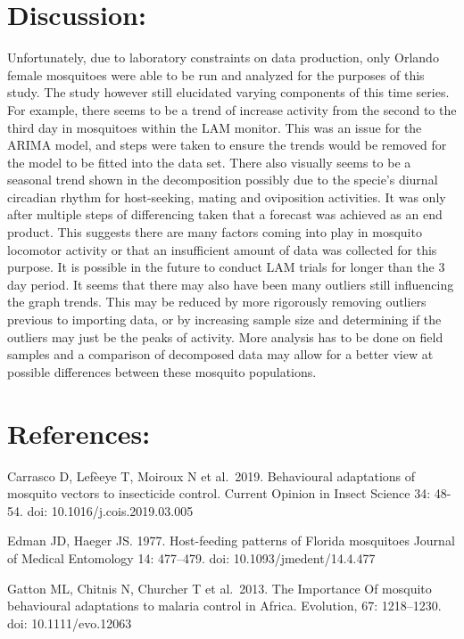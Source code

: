 \documentclass[]{article}
\begin{document}
\hypertarget{discussion}{%
\section{Discussion:}\label{discussion}}

Unfortunately, due to laboratory constraints on data production, only
Orlando female mosquitoes were able to be run and analyzed for the
purposes of this study. The study however still elucidated varying
components of this time series. For example, there seems to be a trend
of increase activity from the second to the third day in mosquitoes
within the LAM monitor. This was an issue for the ARIMA model, and steps
were taken to ensure the trends would be removed for the model to be
fitted into the data set. There also visually seems to be a seasonal
trend shown in the decomposition possibly due to the specie's diurnal
circadian rhythm for host-seeking, mating and oviposition activities. It
was only after multiple steps of differencing taken that a forecast was
achieved as an end product. This suggests there are many factors coming
into play in mosquito locomotor activity or that an insufficient amount
of data was collected for this purpose. It is possible in the future to
conduct LAM trials for longer than the 3 day period. It seems that there
may also have been many outliers still influencing the graph trends.
This may be reduced by more rigorously removing outliers previous to
importing data, or by increasing sample size and determining if the
outliers may just be the peaks of activity. More analysis has to be done
on field samples and a comparison of decomposed data may allow for a
better view at possible differences between these mosquito populations.

\hypertarget{references}{%
\section{References:}\label{references}}

Carrasco D, Lefèeye T, Moiroux N et al.~2019. Behavioural adaptations of
mosquito vectors to insecticide control. Current Opinion in Insect
Science 34: 48-54. doi: 10.1016/j.cois.2019.03.005

Edman JD, Haeger JS. 1977. Host-feeding patterns of Florida mosquitoes
Journal of Medical Entomology 14: 477--479. doi:
10.1093/jmedent/14.4.477

Gatton ML, Chitnis N, Churcher T et al.~2013. The Importance Of mosquito
behavioural adaptations to malaria control in Africa. Evolution, 67:
1218--1230. doi: 10.1111/evo.12063
\end{document}
